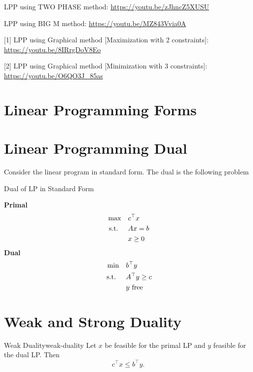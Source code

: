 LPP using TWO PHASE method: \url{https://youtu.be/zJhncZ5XUSU}

LPP using BIG M method: \url{https://youtu.be/MZ843Vvia0A}

[1] LPP using Graphical method [Maximization with 2 constraints]: \url{https://youtu.be/8IRrgDoV8Eo}

[2] LPP using Graphical method [Minimization with 3 constraints]: \url{https://youtu.be/O6QO3J_85as}


\section{Linear Programming Forms}

\section{Linear Programming Dual}
Consider the linear program in standard form.  The dual is the following problem

\begin{general}{Dual of LP in Standard Form}{\polynomial}


\begin{multicols}{2}
\textbf{Primal}
\begin{equation*}
\begin{split}
\max \quad & c^\top x\\
\mbox{ s.t. } \quad & A x = b\\
& x \geq 0
\end{split}
\end{equation*}
\break
\textbf{Dual}
\begin{equation}
\begin{split}
\min \quad & b^\top y\\
\mbox{ s.t. } \quad & A^\top y \geq c\\
& y \mbox{ free }
\end{split}
\end{equation}
\end{multicols}
\end{general}

\section{Weak and Strong Duality}
\begin{theorem}{Weak Duality}{weak-duality}
Let $x$ be feasible for the primal LP and $y$ feasible for the dual LP.  Then 
\begin{equation}
c^\top x \leq b^\top y.
\end{equation}
\end{theorem}

